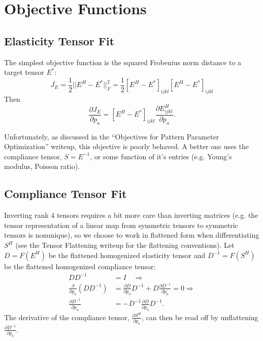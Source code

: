 \documentclass[10pt]{article}
\providecommand{\pder}[2]{\frac{\partial #1}{\partial #2}}
\begin{document}
\section{Objective Functions}
\subsection{Elasticity Tensor Fit}
The simplest objective function is the squared Frobenius norm distance to a
target tensor $E^*$:
$$
J_E = \frac{1}{2} ||E^H - E^*||^2_F = \frac{1}{2} \left[E^H - E^*\right]_{ijkl} \left[E^H - E^*\right]_{ijkl}
$$
Then
$$
\pder{J_E}{p_a} = \left[E^H - E^*\right]_{ijkl} \pder{E^H_{ijkl}}{p_a}.
$$

Unfortunately, as discussed in the ``Objectives for Pattern Parameter
Optimization'' writeup, this objective is poorly behaved. A better one uses
the compliance tensor, $S = E^{-1}$, or some function of it's entries (e.g. Young's
modulus, Poisson ratio).

\subsection{Compliance Tensor Fit}
Inverting rank $4$ tensors requires a bit more care than inverting matrices (e.g.
the tensor representation of a linear map from symmetric tensors to symmetric
tensors is nonunique), so we choose to work in flattened form when differentiating
$S^H$ (see the Tensor Flattening writeup for the flattening conventions). Let $D
= F\left(E^H\right)$ be the flattened homogenized elasticity tensor and $D^{-1}
= F\left(S^H\right)$ be the flattened homogenized compliance tensor:
\begin{align*}
    D D^{-1} &= I \quad \Longrightarrow \\
    \pder{}{p_a} \left(D D^{-1} \right) &= \pder{D}{p_a} D^{-1} + D \pder{D^{-1}}{p_a} = 0 \Longrightarrow \\
    \pder{D^{-1}}{p_a} &= -D^{-1} \pder{D}{p_a} D^{-1}.
\end{align*}
The derivative of the compliance tensor, $\pder{S^H}{p_a}$, can then be read off
by unflattening $\pder{D^{-1}}{p_a}$.
\end{document}
